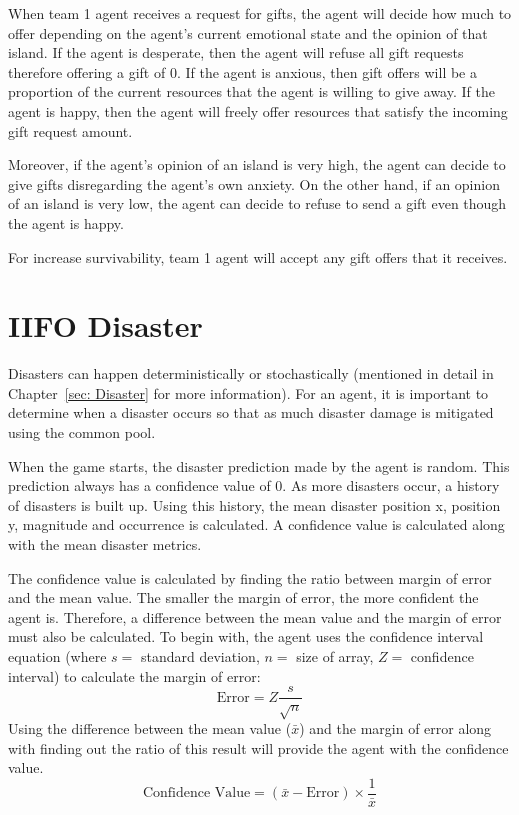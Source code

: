 When team 1 agent receives a request for gifts, the agent will decide how much to offer depending on the agent's current emotional state and the opinion of that island. If the agent is desperate, then the agent will refuse all gift requests therefore offering a gift of 0. If the agent is anxious, then gift offers will be a proportion of the current resources that the agent is willing to give away. If the agent is happy, then the agent will freely offer resources that satisfy the incoming gift request amount.

Moreover, if the agent's opinion of an island is very high, the agent can decide to give gifts disregarding the agent's own anxiety. On the other hand, if an opinion of an island is very low, the agent can decide to refuse to send a gift even though the agent is happy. 

For increase survivability, team 1 agent will accept any gift offers that it receives. 

\section{IIFO Disaster}
Disasters can happen deterministically or stochastically (mentioned in detail in Chapter~\ref{sec: Disaster} for more information). For an agent, it is important to determine when a disaster occurs so that as much disaster damage is mitigated using the common pool. 

When the game starts, the disaster prediction made by the agent is random. This prediction always has a confidence value of 0. As more disasters occur, a history of disasters is built up. Using this history, the mean disaster position x, position y, magnitude and occurrence is calculated. A confidence value is calculated along with the mean disaster metrics. 

The confidence value is calculated by finding the ratio between margin of error and the mean value. The smaller the margin of error, the more confident the agent is. Therefore, a difference between the mean value and the margin of error must also be calculated. To begin with, the agent uses the confidence interval equation (where $s =$ standard deviation, $n = $ size of array, $Z = $ confidence interval) to calculate the margin of error:
\begin{equation}
    \label{eq: Team1MarginOfError}
    \text{Error} = Z \dfrac{s}{\sqrt{n}} 
\end{equation}
Using the difference between the mean value ($\bar{x}$) and the margin of error along with finding out the ratio of this result will provide the agent with the confidence value.
\begin{equation}
    \text{Confidence Value} = (\bar{x} - \text{Error}) \times \dfrac{1}{\bar{x}}
\end{equation}

